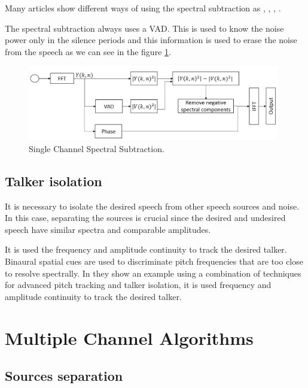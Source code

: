 Many articles show different ways of using the spectral subtraction as \cite{Ephraim1984SpeechEstimator}, \cite{MeyerSubtraction.pdf}, \cite{Smaragdis1998BlindDomain}, \cite{Abdelaziz2005Real-TimeEnhancement}.

The spectral subtraction always uses a VAD. This is used to know the noise power only in the silence periods and this information is used to erase the noise from the speech as we can see in the figure \ref{fig:scspecSubs}.

\begin{figure}[!ht]
  \center
	\includegraphics[width=110mm]{State_of_Art/scspecSubs}
	\caption{Single Channel Spectral Subtraction.}
	\label{fig:scspecSubs}
\end{figure}


\subsection{Talker isolation}

It is necessary to isolate the desired speech from other speech sources and noise. In this case, separating the sources is crucial since the desired and undesired speech have similar spectra and comparable amplitudes.

It is used the frequency and amplitude continuity to track the desired talker. Binaural spatial cues are used to discriminate pitch frequencies that are too close to resolve spectrally. In \cite{Luo1994AReverberation} they show an example using a combination of techniques for advanced pitch tracking and talker isolation, it is used frequency and amplitude continuity to track the desired talker.



\section{Multiple Channel Algorithms}


\subsection{Sources separation}

